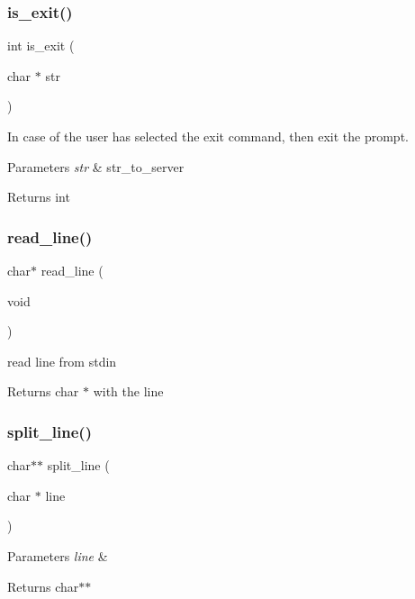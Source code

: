 \subsubsection{is\+\_\+exit()}
{\footnotesize\ttfamily int is\+\_\+exit (\begin{DoxyParamCaption}\item[{char $\ast$}]{str }\end{DoxyParamCaption})}



In case of the user has selected the exit command, then exit the prompt. 


\begin{DoxyParams}{Parameters}
{\em str} & str\+\_\+to\+\_\+server \\
\hline
\end{DoxyParams}
\begin{DoxyReturn}{Returns}
int 
\end{DoxyReturn}
\mbox{\label{prompt_8h_ac14a4d3d27ec36419b82f72342be3a65}} 
\subsubsection{read\+\_\+line()}
{\footnotesize\ttfamily char$\ast$ read\+\_\+line (\begin{DoxyParamCaption}\item[{void}]{ }\end{DoxyParamCaption})}



read line from stdin 

\begin{DoxyReturn}{Returns}
char $\ast$ with the line 
\end{DoxyReturn}
\mbox{\label{prompt_8h_ae3787b54051a7b49115846f09e9716c9}} 
\subsubsection{split\+\_\+line()}
{\footnotesize\ttfamily char$\ast$$\ast$ split\+\_\+line (\begin{DoxyParamCaption}\item[{char $\ast$}]{line }\end{DoxyParamCaption})}


\begin{DoxyParams}{Parameters}
{\em line} & \\
\hline
\end{DoxyParams}
\begin{DoxyReturn}{Returns}
char$\ast$$\ast$ 
\end{DoxyReturn}
